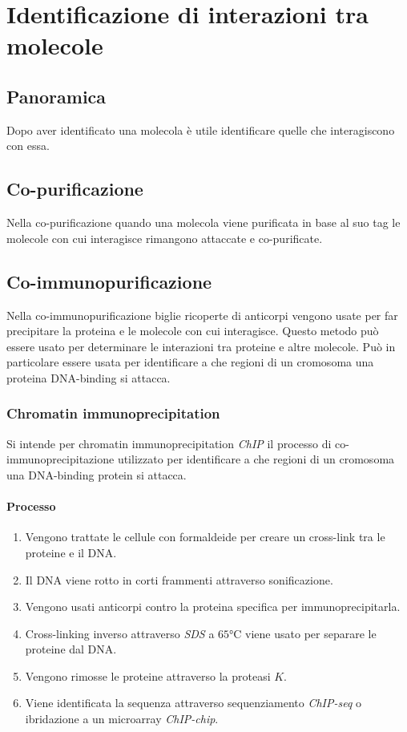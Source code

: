 \section{Identificazione di interazioni tra molecole}

	\subsection{Panoramica}
	Dopo aver identificato una molecola \`e utile identificare quelle che interagiscono con essa.

	\subsection{Co-purificazione}
	Nella co-purificazione quando una molecola viene purificata in base al suo tag le molecole con cui interagisce rimangono attaccate e co-purificate.

	\subsection{Co-immunopurificazione}
	Nella co-immunopurificazione biglie ricoperte di anticorpi vengono usate per far precipitare la proteina e le molecole con cui interagisce.
	Questo metodo pu\`o essere usato per determinare le interazioni tra proteine e altre molecole.
	Pu\`o in particolare essere usata per identificare a che regioni di un cromosoma una proteina DNA-binding si attacca.

		\subsubsection{Chromatin immunoprecipitation}
		Si intende per chromatin immunoprecipitation \emph{ChIP} il processo di co-immunoprecipitazione utilizzato per identificare a che regioni di un cromosoma una DNA-binding protein si attacca.

			\paragraph{Processo}
			\begin{multicols}{2}
				\begin{enumerate}
					\item Vengono trattate le cellule con formaldeide per creare un cross-link tra le proteine e il DNA.
					\item Il DNA viene rotto in corti frammenti attraverso sonificazione.
					\item Vengono usati anticorpi contro la proteina specifica per immunoprecipitarla.
					\item Cross-linking inverso attraverso \emph{SDS} a $65\si{\celsius}$ viene usato per separare le proteine dal DNA.
					\item Vengono rimosse le proteine attraverso la proteasi $K$.
					\item Viene identificata la sequenza attraverso sequenziamento \emph{ChIP-seq} o ibridazione a un microarray \emph{ChIP-chip}.
				\end{enumerate}
			\end{multicols}

